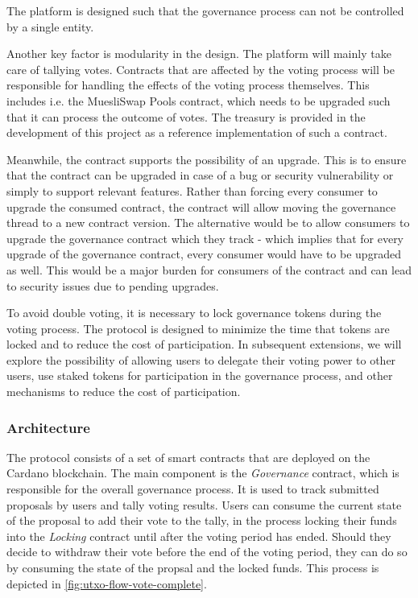 \documentclass[11pt]{article}
\begin{document}
The platform is designed such that the governance process can not be controlled by a single entity.

Another key factor is modularity in the design.
The platform will mainly take care of tallying votes.
Contracts that are affected by the voting process will be responsible for handling the effects of the voting process themselves.
This includes i.e. the MuesliSwap Pools contract, which needs to be upgraded such that it can process the outcome of votes.
The treasury is provided in the development of this project as a reference implementation of such a contract.

Meanwhile, the contract supports the possibility of an upgrade.
This is to ensure that the contract can be upgraded in case of a bug or security vulnerability or simply to support
relevant features.
Rather than forcing every consumer to upgrade the consumed contract,
the contract will allow moving the governance thread to a new contract version.
The alternative would be to allow consumers to upgrade the governance contract which they track -
which implies that for every upgrade of the governance contract, every consumer would have to be upgraded as well.
This would be a major burden for consumers of the contract and can lead to security issues due to pending upgrades.

To avoid double voting, it is necessary to lock governance tokens during the voting process.
The protocol is designed to minimize the time that tokens are locked and to reduce the cost of participation.
In subsequent extensions, we will explore the possibility of allowing users to delegate their voting power to other users,
use staked tokens for participation in the governance process, and other mechanisms to reduce the cost of participation.

\subsubsection{Architecture}

The protocol consists of a set of smart contracts that are deployed on the Cardano blockchain.
The main component is the \emph{Governance} contract, which is responsible for the overall governance process.
It is used to track submitted proposals by users and tally voting results.
Users can consume the current state of the proposal to add their vote to the tally,
in the process locking their funds into the \emph{Locking} contract until after the voting period has ended.
Should they decide to withdraw their vote before the end of the voting period, they can do so by consuming the
state of the propsal and the locked funds.
This process is depicted in \cref{fig:utxo-flow-vote-complete}.
\end{document}

